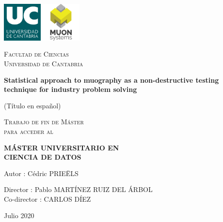 \documentclass[a4paper, 11pt]{report}
\begin{document}

\begin{titlepage}

	\centering
	\includegraphics[width=0.15\textwidth]{figs/image_UC.png} \hspace{20pt} \includegraphics[width=0.15\textwidth]{figs/muonSystems.png} \par\vspace{1cm}
	{\scshape\LARGE Facultad de Ciencias \\ Universidad de Cantabria \par}
	
	\vspace{1.5cm}
	
	{\huge\bfseries Statistical approach to muography as a non-destructive testing technique for \newline industry problem solving}
	
	\vspace{0.6cm}
		
	{\LARGE (T\'itulo en espa\~nol) \par}
	
	\vspace{3cm}
	{\scshape\Large Trabajo de fin de M\'aster \\ para acceder al \par}
	\vspace{0.3cm}
	{\scshape\Large \textbf{M\'ASTER UNIVERSITARIO EN \\ CIENCIA DE DATOS} \par}
	
	\begin{flushright}
	
	\vspace{3cm}
	{\Large Autor : C\'edric PRIE\"ELS\par}
	{\Large Director : Pablo MART\'INEZ RUIZ DEL \'ARBOL\\}
	{\Large Co-director : CARLOS D\'IEZ\\}
	\vspace{0.5cm}
	{\Large Julio 2020\par}
	\vfill
	
	\end{flushright}

\end{titlepage}
\end{document}
